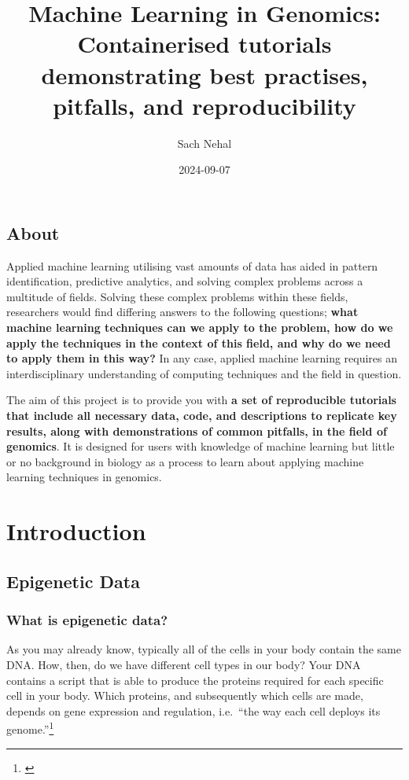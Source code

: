 \documentclass[
]{book}
\title{Machine Learning in Genomics: Containerised tutorials demonstrating best practises, pitfalls, and reproducibility}
\author{Sach Nehal}
\date{2024-09-07}
\begin{document}
\maketitle

{
\setcounter{tocdepth}{1}
\tableofcontents
}
\chapter*{About}\label{about}

Applied machine learning utilising vast amounts of data has aided in pattern identification, predictive analytics, and solving complex problems across a multitude of fields. Solving these complex problems within these fields, researchers would find differing answers to the following questions; \textbf{what machine learning techniques can we apply to the problem, how do we apply the techniques in the context of this field, and why do we need to apply them in this way?} In any case, applied machine learning requires an interdisciplinary understanding of computing techniques and the field in question.

The aim of this project is to provide you with \textbf{a set of reproducible tutorials that include all necessary data, code, and descriptions to replicate key results, along with demonstrations of common pitfalls, in the field of genomics}. It is designed for users with knowledge of machine learning but little or no background in biology as a process to learn about applying machine learning techniques in genomics.

\part{Introduction}\label{part-introduction}

\chapter{Epigenetic Data}\label{epigenetic-data}

\section{What is epigenetic data?}\label{what-is-epigenetic-data}

As you may already know, typically all of the cells in your body contain the same DNA. How, then, do we have different cell types in our body? Your DNA contains a script that is able to produce the proteins required for each specific cell in your body. Which proteins, and subsequently which cells are made, depends on gene expression and regulation, i.e.~``the way each cell deploys its genome.''\footnote{\citet{ralston2008}}
\end{document}

